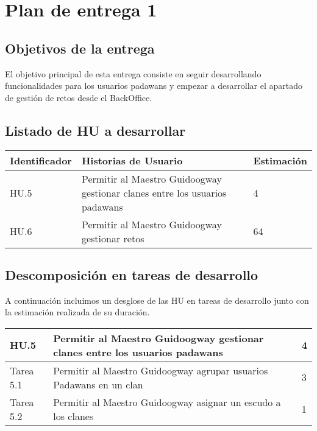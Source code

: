 \section{Plan de entrega 1}

\subsection{Objetivos de la entrega}

El objetivo principal de esta entrega consiste en seguir desarrollando funcionalidades para los usuarios padawans y empezar a desarrollar el apartado de gestión de retos desde el BackOffice.

\subsection{Listado de HU a desarrollar}

\begin{table}[h]
	\centering
	\begin{tabular}{| p{2.3cm} | p{6.7cm} | p{2cm} |}
		\rowcolor[HTML]{329A9D} 
		{\color[HTML]{FFFFFF} \textbf{Identificador}} & {\color[HTML]{FFFFFF} \textbf{Historias de Usuario}} & {\color[HTML]{FFFFFF} \textbf{Estimación}}  \\ \hline
		HU.5 & Permitir al Maestro Guidoogway gestionar clanes entre los usuarios padawans & 4 \\ \hline
		HU.6 & Permitir al Maestro Guidoogway gestionar retos & 64 \\ \hline
	\end{tabular}
\end{table}

\subsection{Descomposición en tareas de desarrollo}

A continuación incluimos un desglose de las HU en tareas de desarrollo junto con la estimación realizada de su duración.\\

\begin{table}[h]
	\centering
	\begin{tabular}{| p{2.3cm} | p{6.7cm} | p{2cm} |}
		\rowcolor[HTML]{329A9D} 
		{\color[HTML]{FFFFFF} \textbf{HU.5}} & {\color[HTML]{FFFFFF} \textbf{Permitir al Maestro Guidoogway gestionar clanes entre los usuarios padawans}} & {\color[HTML]{FFFFFF} \textbf{4}}  \\ \hline
		Tarea 5.1 & Permitir al Maestro Guidoogway agrupar usuarios Padawans en un clan & 3 \\ \hline
		Tarea 5.2 & Permitir al Maestro Guidoogway asignar un escudo a los clanes & 1 \\ \hline
	\end{tabular}
\end{table}

